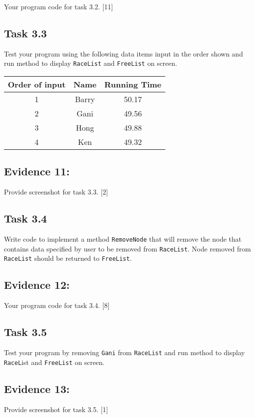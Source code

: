 Your program code for task 3.2. \hfill{}{[}11{]}

\subsection*{Task 3.3 }

Test your program using the following data items input in the order
shown and run method to display \texttt{RaceList} and \texttt{FreeList}
on screen. 
\noindent \begin{center}
\begin{tabular}{|c|c|c|}
\hline 
\textbf{Order of input } & \textbf{Name} & \textbf{Running Time}\tabularnewline
\hline 
\hline 
1 & Barry & 50.17\tabularnewline
\hline 
2 & Gani  & 49.56\tabularnewline
\hline 
3 & Hong & 49.88\tabularnewline
\hline 
4 & Ken & 49.32 \tabularnewline
\hline 
\end{tabular} 
\par\end{center}

\subsection*{Evidence 11: }

Provide screenshot for task 3.3. \hfill{} {[}2{]}

\subsection*{Task 3.4 }

Write code to implement a method \texttt{RemoveNode} that will remove
the node that contains data specified by user to be removed from \texttt{RaceList}.
Node removed from \texttt{RaceList} should be returned to \texttt{FreeList}. 

\subsection*{Evidence 12: }

Your program code for task 3.4. \hfill{}{[}8{]}

\subsection*{Task 3.5 }

Test your program by removing \texttt{Gani} from \texttt{RaceList}
and run method to display \texttt{RaceL}ist and \texttt{FreeList}
on screen. 

\subsection*{Evidence 13: }

Provide screenshot for task 3.5. \hfill{} {[}1{]}